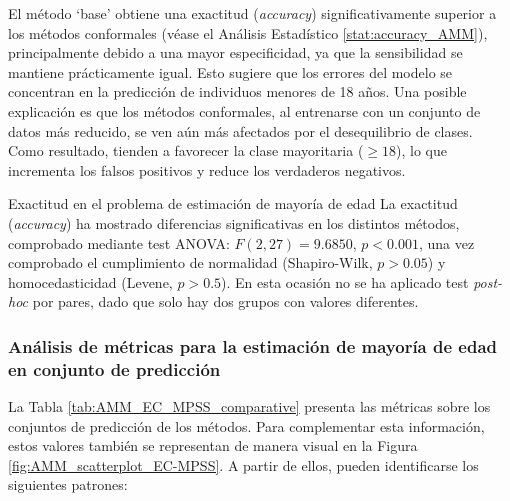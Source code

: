 \begin{table}[h]
    \caption[
        Problema de estimación de mayoría de edad: 
        Exactitud, sensibilidad y especifidad obtenidos por cada método de predicción a lo largo de distintas ejecuciones. 
    ]{   
        Exactitud, sensibilidad y especifidad obtenidos por cada método de predicción a lo largo de distintas ejecuciones. 
        Se presentan los valores para cada ejecución individual, así como la media final de cada métrica.
        `CP' se refiere a los métodos conformales empleados: LAC y MCM (se recuerda que es el mismo modelo para todos los métodos conformales y, por ello, presentan los mismas predicciones puntuales). Se marca en negrita la media con mejor valor para cada métrica. 
    }
    \label{tab:AMM_accuracy_comparative}
\end{table}

El método `base' obtiene una exactitud (\textit{accuracy}) significativamente superior a los métodos conformales (véase el Análisis Estadístico \ref{stat:accuracy_AMM}), 
principalmente debido a una mayor especificidad, ya que la sensibilidad se mantiene prácticamente igual. Esto sugiere que los errores del modelo se concentran en la predicción de individuos menores de 18 años. Una posible explicación es que los métodos conformales, al entrenarse con un conjunto de datos más reducido, se ven aún más afectados por el desequilibrio de clases. Como resultado, tienden a favorecer la clase mayoritaria ($\ge 18$), lo que incrementa los falsos positivos y reduce los verdaderos negativos.


\begin{StatisticsRef}{Exactitud en el problema de estimación de mayoría de edad}
    La exactitud (\textit{accuracy}) ha mostrado diferencias significativas en los distintos métodos, comprobado mediante test ANOVA: $F(2, 27) = 9.6850$, $p < 0.001$, una vez comprobado el cumplimiento de normalidad (Shapiro-Wilk, $p>0.05$) y homocedasticidad (Levene, $p>0.5$). En esta ocasión no se ha aplicado test \textit{post-hoc} por pares, dado que solo hay dos grupos con valores diferentes.
\end{StatisticsRef}


\FloatBarrier


\subsubsection{Análisis de métricas para la estimación de mayoría de edad en conjunto de predicción}

La Tabla \ref{tab:AMM_EC_MPSS_comparative} presenta las métricas sobre los conjuntos de predicción de los métodos. Para complementar esta información, estos valores también se representan de manera visual en la Figura \ref{fig:AMM_scatterplot_EC-MPSS}. A partir de ellos, pueden identificarse los siguientes patrones:

